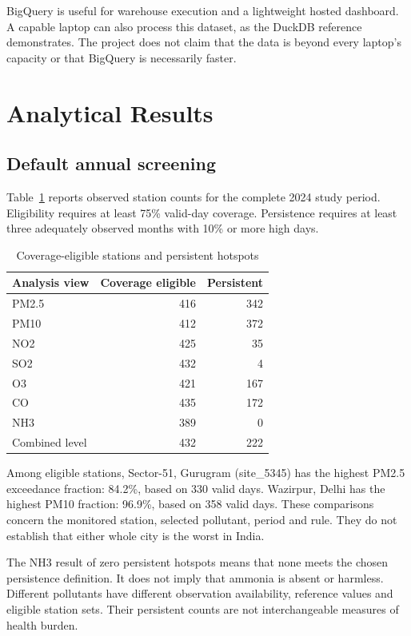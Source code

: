 \documentclass[11pt,a4paper]{article}
\begin{document}
BigQuery is useful for warehouse execution and a lightweight hosted dashboard. A capable laptop can also process this dataset, as the DuckDB reference demonstrates. The project does not claim that the data is beyond every laptop's capacity or that BigQuery is necessarily faster.

\newpage
\section{Analytical Results}
\subsection{Default annual screening}
Table~\ref{tab:results} reports observed station counts for the complete 2024 study period. Eligibility requires at least 75\% valid-day coverage. Persistence requires at least three adequately observed months with 10\% or more high days.

\begin{table}[H]\centering\caption{Coverage-eligible stations and persistent hotspots}\label{tab:results}
\begin{tabular}{lrr}\toprule
Analysis view & Coverage eligible & Persistent\\\midrule
PM2.5 & 416 & 342\\
PM10 & 412 & 372\\
NO2 & 425 & 35\\
SO2 & 432 & 4\\
O3 & 421 & 167\\
CO & 435 & 172\\
NH3 & 389 & 0\\
Combined level & 432 & 222\\\bottomrule
\end{tabular}\end{table}

Among eligible stations, Sector-51, Gurugram (site\_5345) has the highest PM2.5 exceedance fraction: 84.2\%, based on 330 valid days. Wazirpur, Delhi has the highest PM10 fraction: 96.9\%, based on 358 valid days. These comparisons concern the monitored station, selected pollutant, period and rule. They do not establish that either whole city is the worst in India.

The NH3 result of zero persistent hotspots means that none meets the chosen persistence definition. It does not imply that ammonia is absent or harmless. Different pollutants have different observation availability, reference values and eligible station sets. Their persistent counts are not interchangeable measures of health burden.
\end{document}
